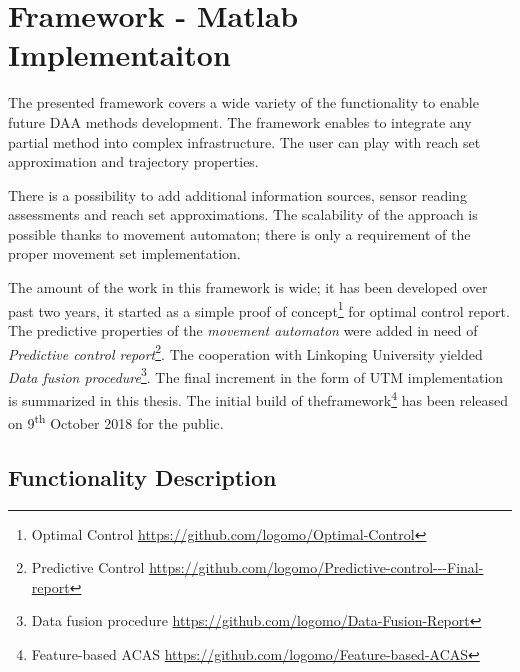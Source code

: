 \cleardoublepage

\chapter{Framework - Matlab Implementaiton}
\noindent The presented framework covers a wide variety of the functionality to enable future DAA methods development. The framework enables to integrate any partial method into complex infrastructure. The user can play with reach set approximation and trajectory properties. 

There is a possibility to add additional information sources, sensor reading assessments and reach set approximations. The scalability of the approach is possible thanks to movement automaton; there is only a requirement of the proper movement set implementation. 

The amount of the work in this framework is wide; it has been developed over past two years, it started as a simple proof of concept\footnote{Optimal Control \url{https://github.com/logomo/Optimal-Control}} for optimal control report. The predictive properties of the \emph{movement automaton} were added in need of \emph{Predictive control report}\footnote{Predictive Control \url{https://github.com/logomo/Predictive-control---Final-report}}. The cooperation with Linkoping University yielded \emph{Data fusion procedure}\footnote{Data fusion procedure \url{https://github.com/logomo/Data-Fusion-Report}}. The final increment in the form of UTM implementation is summarized in this thesis. The initial build of theframework\footnote{Feature-based ACAS \url{https://github.com/logomo/Feature-based-ACAS}} has been released on 9\textsuperscript{th} October 2018 for the public. 

\section{Functionality Description}
